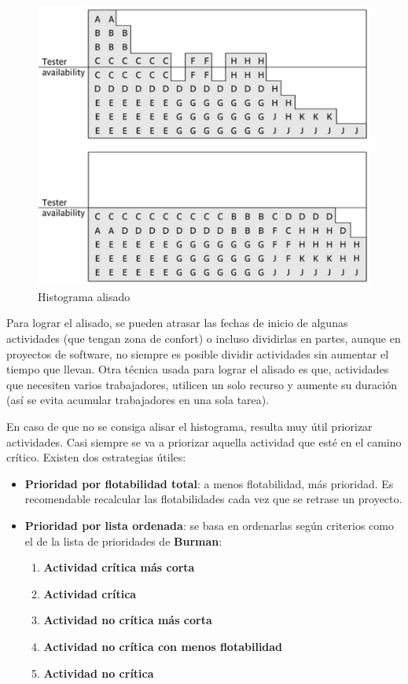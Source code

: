 \documentclass[12pt]{article}
\begin{document}
\begin{figure} [ht]
    \centering
    \includegraphics[keepaspectratio=true, scale=0.75]{images/Suavizado_de_histograma.png}
    \caption{Histograma alisado}
    \label{fig:8.2}
\end{figure}

\newpage
{Para lograr el alisado, se pueden atrasar las fechas de inicio de algunas actividades (que tengan zona de confort) o incluso dividirlas en partes, aunque en proyectos de software, no siempre es posible dividir actividades sin aumentar el tiempo que llevan. Otra técnica usada para lograr el alisado es que, actividades que necesiten varios trabajadores, utilicen un solo recurso y aumente su duración (así se evita acumular trabajadores en una sola tarea).} \bigskip

{En caso de que no se consiga alisar el histograma, resulta muy útil priorizar actividades. Casi siempre se va a priorizar aquella actividad que esté en el camino crítico. Existen dos estrategias útiles:}

\begin{itemize}
    \item {\textbf{Prioridad por flotabilidad total}: a menos flotabilidad, más prioridad. Es recomendable recalcular las flotabilidades cada vez que se retrase un proyecto.}
    \item {\textbf{Prioridad por lista ordenada}: se basa en ordenarlas según criterios como el de la lista de prioridades de \textbf{Burman}:}
    
    \begin{enumerate}
        \item \textbf{Actividad crítica más corta}
        \item \textbf{Actividad crítica}
        \item \textbf{Actividad no crítica más corta}
        \item \textbf{Actividad no crítica con menos flotabilidad}
        \item \textbf{Actividad no crítica}
    \end{enumerate}
    
\end{itemize}
\end{document}
